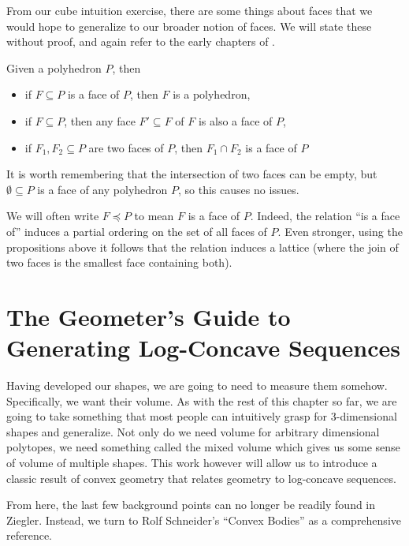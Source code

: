 \documentclass[12pt,oneside]{../../sfsuthesis}
\begin{document}
From our cube intuition exercise, there are some things about faces that we would hope to generalize to our broader notion of faces.
We will state these without proof, and again refer to the early chapters of \cite{zieglerLecturesPolytopes1995}.
\begin{proposition}
    Given a polyhedron \( P \), then
    \begin{itemize}
        \item if \( F \subseteq P \) is a face of \( P \), then \( F \) is a polyhedron,
        \item if \( F \subseteq P \), then any face \( F' \subseteq F \) of \( F \) is also a face of \( P \),
        \item if \( F_1, F_2 \subseteq P \) are two faces of \( P \), then \( F_1 \cap F_2 \) is a face of \( P \)
    \end{itemize}
\end{proposition}
It is worth remembering that the intersection of two faces can be empty, but \( \emptyset \subseteq P \) is a face of any polyhedron \( P \), so this causes no issues.

We will often write \( F \preceq P \) to mean \( F \) is a face of \( P \).
Indeed, the relation ``is a face of'' induces a partial ordering on the set of all faces of \( P \).
Even stronger, using the propositions above it follows that the relation induces a lattice (where the join of two faces is the smallest face containing both).

\section{The Geometer's Guide to Generating Log-Concave Sequences}
Having developed our shapes, we are going to need to measure them somehow.
Specifically, we want their volume.
As with the rest of this chapter so far, we are going to take something that most people can intuitively grasp for 3-dimensional shapes and generalize.
Not only do we need volume for arbitrary dimensional polytopes, we need something called the mixed volume which gives us some sense of volume of multiple shapes.
This work however will allow us to introduce a classic result of convex geometry that relates geometry to log-concave sequences.

From here, the last few background points can no longer be readily found in Ziegler.
Instead, we turn to Rolf Schneider's ``Convex Bodies'' \cite{schneiderConvexBodiesBrunn2013} as a comprehensive reference.
\end{document}
